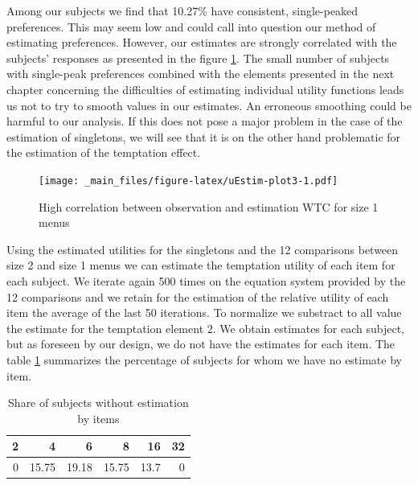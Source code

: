 \documentclass[
]{book}
\begin{document}
Among our subjects we find that
10.27\% have consistent, single-peaked
preferences.
This may seem low and could call into question our method of estimating
preferences.
However, our estimates are strongly correlated with the subjects' responses as
presented in the figure \ref{fig:uEstim-plot3}.
The small number of subjects with single-peak preferences combined with the
elements presented in the next chapter concerning the difficulties of estimating
individual utility functions leads us not to try to smooth values in our
estimates.
An erroneous smoothing could be harmful to our analysis.
If this does not pose a major problem in the case of the estimation of
singletons, we will see that it is on the other hand problematic for the
estimation of the temptation effect.

\begin{figure}
\centering
\texttt{[image: \_main\_files/figure-latex/uEstim-plot3-1.pdf]}
\caption{\label{fig:uEstim-plot3}High correlation between observation and estimation WTC for size 1 menus}
\end{figure}

Using the estimated utilities for the singletons and the 12 comparisons between
size 2 and size 1 menus we can estimate the temptation utility of each item for
each subject.
We iterate again 500 times on the equation system provided by the 12 comparisons
and we retain for the estimation of the relative utility of each item the
average of the last 50 iterations.
To normalize we substract to all value the estimate for the temptation element
\(2\).
We obtain estimates for each subject, but as foreseen by our design, we do not
have the estimates for each item.
The table \ref{tab:no-estim3} summarizes the percentage of subjects for whom we have no
estimate by item.

\begin{table}

\caption{\label{tab:no-estim3}Share of subjects without estimation by items}
\centering
\begin{tabular}[t]{r|r|r|r|r|r}
\hline
2 & 4 & 6 & 8 & 16 & 32\\
\hline
0 & 15.75 & 19.18 & 15.75 & 13.7 & 0\\
\hline
\end{tabular}
\end{table}
\end{document}

